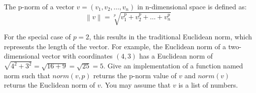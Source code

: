  \label{sssec:ex1_28}

The p-norm of a vector $v = (v_{1} ,v_{2} ,\ldots,v_{n} )$ in n-dimensional space is defined as:\\

\[
	\left\|v\right\| = \sqrt[p]{v^{p}_{1} + v^{p}_{2} + \ldots + v^{p}_{n}}
\]

For the special case of $p = 2$, this results in the traditional Euclidean norm, which represents the length of the vector. For example, the Euclidean norm of a two-dimensional vector with coordinates $(4,3)$ has a Euclidean norm of $\sqrt{4^{2} + 3^{2}} = \sqrt{16 + 9} = \sqrt{25} = 5$. Give an implementation of a function named norm such that $norm(v, p)$ returns the p-norm value of $v$ and $norm(v)$ returns the Euclidean norm of $v$. You may assume that $v$ is a list of numbers.

